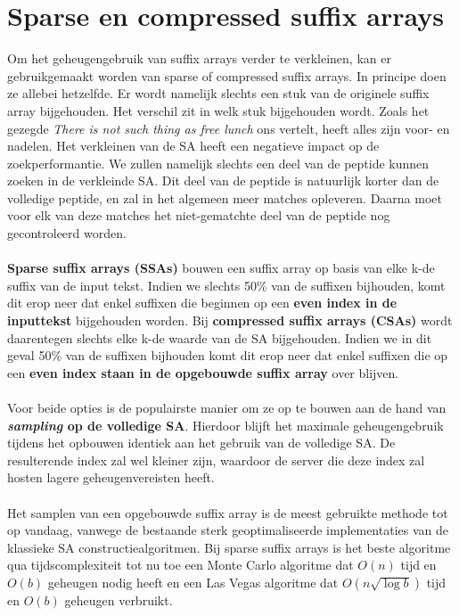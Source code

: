 \section{Sparse en compressed suffix arrays}\label{sec:sparse-en-compressed-suffix-arrays}
Om het geheugengebruik van suffix arrays verder te verkleinen, kan er gebruikgemaakt worden van sparse of compressed suffix arrays.
In principe doen ze allebei hetzelfde.
Er wordt namelijk slechts een stuk van de originele suffix array bijgehouden.
Het verschil zit in welk stuk bijgehouden wordt.
Zoals het gezegde \textit{There is not such thing as free lunch} ons vertelt, heeft alles zijn voor- en nadelen.
Het verkleinen van de SA heeft een negatieve impact op de zoekperformantie.
We zullen namelijk slechts een deel van de peptide kunnen zoeken in de verkleinde SA\@.
Dit deel van de peptide is natuurlijk korter dan de volledige peptide, en zal in het algemeen meer matches opleveren.
Daarna moet voor elk van deze matches het niet-gematchte deel van de peptide nog gecontroleerd worden.
\\ \\
\textbf{Sparse suffix arrays (SSAs)} bouwen een suffix array op basis van elke k-de suffix van de input tekst.
Indien we slechts 50\% van de suffixen bijhouden, komt dit erop neer dat enkel suffixen die beginnen op een \textbf{even index in de inputtekst} bijgehouden worden.
Bij \textbf{compressed suffix arrays (CSAs)} wordt daarentegen slechts elke k-de waarde van de SA bijgehouden.
Indien we in dit geval 50\% van de suffixen bijhouden komt dit erop neer dat enkel suffixen die op een \textbf{even index staan in de opgebouwde suffix array} over blijven.
\\ \\
Voor beide opties is de populairste manier om ze op te bouwen aan de hand van \textbf{\textit{sampling} op de volledige SA\@}.
Hierdoor blijft het maximale geheugengebruik tijdens het opbouwen identiek aan het gebruik van de volledige SA\@.
De resulterende index zal wel kleiner zijn, waardoor de server die deze index zal hosten lagere geheugenvereisten heeft.
\\ \\
Het samplen van een opgebouwde suffix array is de meest gebruikte methode tot op vandaag, vanwege de bestaande sterk geoptimaliseerde implementaties van de klassieke SA constructiealgoritmen.
Bij sparse suffix arrays is het beste algoritme qua tijdscomplexiteit tot nu toe een Monte Carlo algoritme dat $O(n)$ tijd en $O(b)$ geheugen nodig heeft en een Las Vegas algoritme dat $O(n \sqrt{\log b})$ tijd en $O(b)$ geheugen verbruikt.
